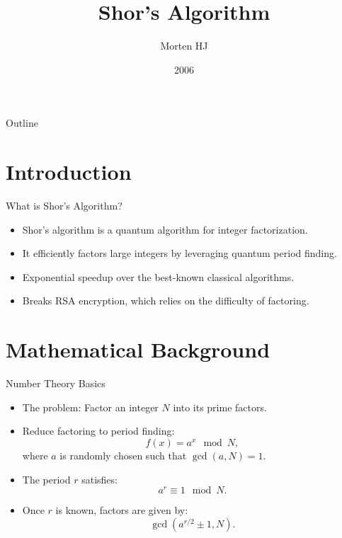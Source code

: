 \documentclass{beamer}
\title{Shor's Algorithm}
\author{Morten HJ}
\date{2006}
\begin{document}
\begin{frame}
    \titlepage
\end{frame}

\begin{frame}{Outline}
    \tableofcontents
\end{frame}

\section{Introduction}
\begin{frame}{What is Shor's Algorithm?}
    \begin{itemize}
        \item Shor's algorithm is a quantum algorithm for integer factorization.
        \item It efficiently factors large integers by leveraging quantum period finding.
        \item Exponential speedup over the best-known classical algorithms.
        \item Breaks RSA encryption, which relies on the difficulty of factoring.
    \end{itemize}
\end{frame}

\section{Mathematical Background}
\begin{frame}{Number Theory Basics}
    \begin{itemize}
        \item The problem: Factor an integer $N$ into its prime factors.
        \item Reduce factoring to period finding:  
        \[ f(x) = a^x \mod N, \]
        where $a$ is randomly chosen such that $\gcd(a, N) = 1$.
        \item The period $r$ satisfies:
        \[ a^r \equiv 1 \mod N. \]
        \item Once $r$ is known, factors are given by:
        \[ \gcd(a^{r/2} \pm 1, N). \]
    \end{itemize}
\end{frame}

\end{document}
